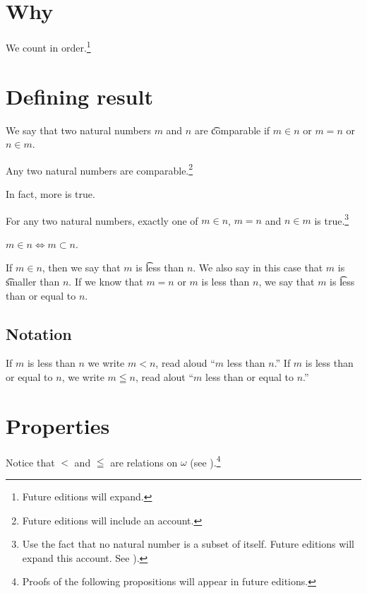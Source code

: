 

\section*{Why}

We count in order.\footnote{Future editions will expand.}

\section*{Defining result}

We say that two natural numbers $m$ and $n$ are \t{comparable} if $m \in n$ or $m = n$ or $n \in m$.

\begin{proposition}
Any two natural numbers are comparable.\footnote{Future editions will include an account.}\end{proposition}
In fact, more is true.

\begin{proposition}
For any two natural numbers, exactly one of $m \in n$, $m = n$ and $n \in m$ is true.\footnote{Use the fact that no natural number is a subset of itself. Future editions will expand this account. See ).}\end{proposition}
\begin{proposition}
$m \in n \iff m \subset n$.\end{proposition}
If $m \in n$, then we say that $m$ is \t{less than} $n$.
We also say in this case that $m$ is \t{smaller than} $n$.
If we know that $m = n$ or $m$ is less than $n$, we say that $m$ is \t{less than or equal to} $n$.

\subsection*{Notation}

If $m$ is less than $n$ we write $m < n$, read aloud ``$m$ less than $n$.''
If $m$ is less than or equal to $n$, we write $m \leqq n$, read alout ``$m$ less than or equal to $n$.''

\section*{Properties}

Notice that $<$ and $\leqq$ are relations on $\omega $ (see ).\footnote{Proofs of the following propositions will appear in future editions.}

